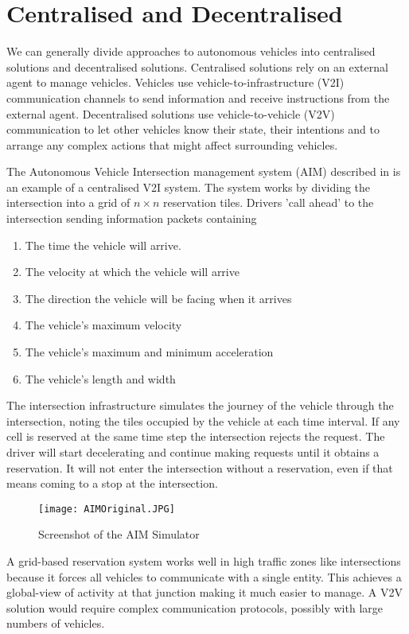 \section{Centralised and Decentralised}
\label{sec:Centralised Systems}
We can generally divide approaches to autonomous vehicles into centralised solutions and decentralised solutions. Centralised solutions rely on an external agent to manage vehicles. Vehicles use vehicle-to-infrastructure (V2I) communication channels to send information and receive instructions from the external agent. Decentralised solutions use vehicle-to-vehicle (V2V) communication to let other vehicles know their state, their intentions and to arrange any complex actions that might affect surrounding vehicles.

The Autonomous Vehicle Intersection management system (AIM) described in \citep{Dresner2004} is an example of a centralised V2I system. The system works by dividing the intersection into a grid of $n \times n$ reservation tiles. Drivers 'call ahead' to the intersection sending information packets containing

\begin{enumerate}
\item The time the vehicle will arrive.
\item The velocity at which the vehicle will arrive
\item The direction the vehicle will be facing when it arrives
\item The vehicle's maximum velocity
\item The vehicle's maximum and minimum acceleration
\item The vehicle's length and width
\end{enumerate}

The intersection infrastructure simulates the journey of the vehicle through the intersection, noting the tiles occupied by the vehicle at each time interval. If any cell is reserved at the same time step the intersection rejects the request. The driver will start decelerating and continue making requests until it obtains a reservation. It will not enter the intersection without a reservation, even if that means coming to a stop at the intersection.

\begin{figure}[htb]
\texttt{[image: AIMOriginal.JPG]}
\caption{Screenshot of the AIM Simulator}
\end{figure}

A grid-based reservation system works well in high traffic zones like intersections because it forces all vehicles to communicate with a single entity. This achieves a global-view of activity at that junction making it much easier to manage. A V2V solution would require complex communication protocols, possibly with large numbers of vehicles.


